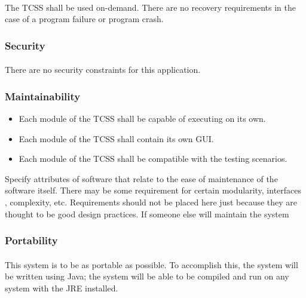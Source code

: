 \documentclass{article}
\begin{document}
    \paragraph{}
    The TCSS shall be used on-demand. There are no recovery requirements in the case of a program failure or program crash.

    \subsubsection{Security}
    \paragraph{}
    There are no security constraints for this application.
    

    \subsubsection{Maintainability}
    \begin{itemize}
        \item Each module of the TCSS shall be capable of executing on its own.
        \item Each module of the TCSS shall contain its own GUI.
        \item Each module of the TCSS shall be compatible with the testing scenarios.
    \end{itemize}
   
    
    Specify attributes of software that relate to the ease of maintenance of the software itself.  There may be some requirement for certain modularity, interfaces , complexity, etc.  Requirements should not be placed here just because they are thought to be good design practices. If someone else will maintain the system
    

    \subsubsection{Portability}
    
    \paragraph{}
    This system is to be as portable as possible. To accomplish this, the system will be written using Java; the system will be able to be compiled and run on any system with the JRE installed. 
    
\end{document}
